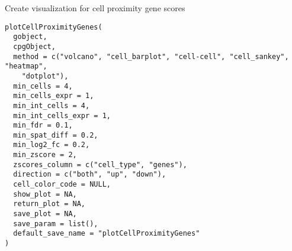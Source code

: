 \documentclass[a4paper]{book}
\begin{document}
%
\begin{Description}\relax
Create visualization for cell proximity gene scores
\end{Description}
%
\begin{Usage}
\begin{verbatim}
plotCellProximityGenes(
  gobject,
  cpgObject,
  method = c("volcano", "cell_barplot", "cell-cell", "cell_sankey", "heatmap",
    "dotplot"),
  min_cells = 4,
  min_cells_expr = 1,
  min_int_cells = 4,
  min_int_cells_expr = 1,
  min_fdr = 0.1,
  min_spat_diff = 0.2,
  min_log2_fc = 0.2,
  min_zscore = 2,
  zscores_column = c("cell_type", "genes"),
  direction = c("both", "up", "down"),
  cell_color_code = NULL,
  show_plot = NA,
  return_plot = NA,
  save_plot = NA,
  save_param = list(),
  default_save_name = "plotCellProximityGenes"
)
\end{verbatim}
\end{Usage}
%
\end{document}
